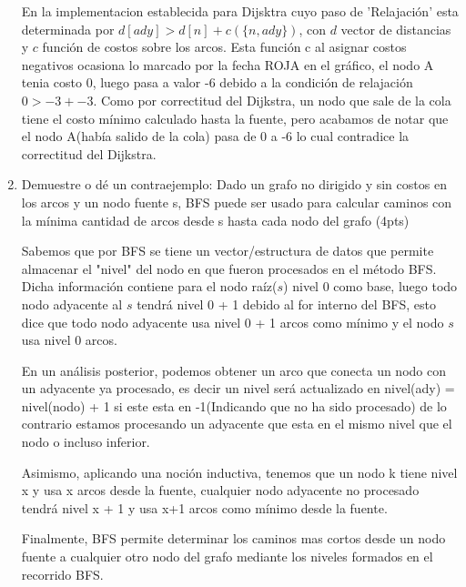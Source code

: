 \documentclass[a4paper,12pt]{article}
\begin{document}
\begin{enumerate}
En la implementacion establecida para Dijsktra cuyo paso de 'Relajación' esta determinada por $d[ady] > d[n]+c(\{n, ady\})$, con $d$ vector de distancias y $c$ función de costos sobre los arcos. Esta función c al asignar costos negativos ocasiona lo marcado por la fecha ROJA en el gráfico, el nodo A tenia costo 0, luego pasa a valor -6 debido a la condición de relajación $0 > -3 + -3$. Como por correctitud del Dijkstra, un nodo que sale de la cola tiene el costo mínimo calculado hasta la fuente, pero acabamos de notar que el nodo A(había salido de la cola) pasa de 0 a -6 lo cual contradice la correctitud del Dijkstra.

\item Demuestre o dé un contraejemplo: Dado un grafo no dirigido y sin costos en los arcos y un nodo fuente s, BFS puede ser usado para calcular caminos con la mínima cantidad de arcos desde s hasta cada nodo del grafo (4pts)

Sabemos que por BFS se tiene un vector/estructura de datos que permite almacenar el "nivel" del nodo en que fueron procesados en el método BFS. Dicha información contiene para el nodo raíz($s$) nivel 0 como base, luego todo nodo adyacente al $s$ tendrá nivel 0 + 1 debido al for interno del BFS, esto dice que todo nodo adyacente usa nivel 0 + 1 arcos como mínimo y el nodo $s$ usa nivel 0 arcos.

En un análisis posterior, podemos obtener un arco que conecta un nodo con un adyacente ya procesado, es decir un nivel será actualizado en nivel(ady) = nivel(nodo) + 1 si este esta en -1(Indicando que no ha sido procesado) de lo contrario estamos procesando un adyacente que esta en el mismo nivel que el nodo o incluso inferior. 

Asimismo, aplicando una noción inductiva, tenemos que un nodo k tiene nivel x y usa x arcos desde la fuente, cualquier nodo adyacente no procesado tendrá nivel x + 1 y usa x+1 arcos como mínimo desde la fuente.

Finalmente, BFS permite determinar los caminos mas cortos desde un nodo fuente a cualquier otro nodo del grafo mediante los niveles formados en el recorrido BFS.

\end{enumerate}
\end{document}
